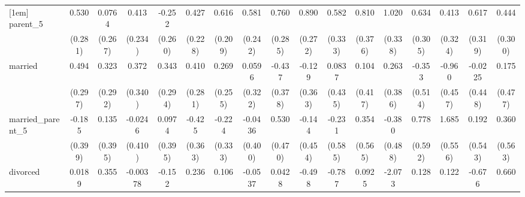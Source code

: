 {\begin{tabular}{l*{16}{c}}
[1em]
parent\_5            &       0.530         &      0.0764         &       0.413         &      -0.252         &       0.427         &       0.616\sym{**} &       0.581\sym{*}  &       0.760\sym{**} &       0.890\sym{**} &       0.582         &       0.810\sym{*}  &       1.020\sym{**} &       0.634\sym{*}  &       0.413         &       0.617         &       0.444         \\
                    &     (0.281)         &     (0.267)         &     (0.234)         &     (0.260)         &     (0.228)         &     (0.209)         &     (0.242)         &     (0.285)         &     (0.272)         &     (0.333)         &     (0.376)         &     (0.338)         &     (0.305)         &     (0.324)         &     (0.319)         &     (0.300)         \\
[1em]
married             &       0.494         &       0.323         &       0.372         &       0.343         &       0.410         &       0.269         &      0.0596         &      -0.437         &      -0.129         &      0.0837         &       0.104         &       0.263         &      -0.353         &      -0.960\sym{*}  &     -0.0225         &       0.175         \\
                    &     (0.297)         &     (0.292)         &     (0.340)         &     (0.294)         &     (0.281)         &     (0.255)         &     (0.322)         &     (0.378)         &     (0.363)         &     (0.435)         &     (0.417)         &     (0.386)         &     (0.514)         &     (0.457)         &     (0.448)         &     (0.477)         \\
[1em]
married\_parent\_5    &      -0.185         &       0.135         &     -0.0246         &      0.0974         &      -0.425         &      -0.224         &     -0.0436         &       0.530         &      -0.144         &      -0.231         &       0.354         &      -0.380         &       0.778         &       1.685\sym{**} &       0.192         &       0.360         \\
                    &     (0.399)         &     (0.395)         &     (0.410)         &     (0.395)         &     (0.363)         &     (0.333)         &     (0.400)         &     (0.470)         &     (0.454)         &     (0.585)         &     (0.565)         &     (0.488)         &     (0.592)         &     (0.556)         &     (0.543)         &     (0.563)         \\
[1em]
divorced            &      0.0189         &       0.355         &    -0.00378         &      -0.152         &       0.236         &       0.106         &     -0.0537         &      0.0428         &      -0.498         &      -0.787         &      0.0925         &      -2.073\sym{*}  &       0.128         &       0.122         &      -0.676         &       0.660         \\

\end{tabular}}
